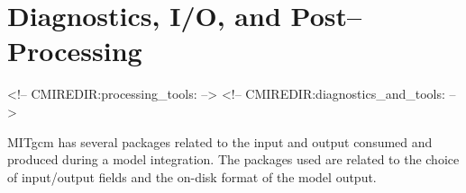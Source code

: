
\chapter{Diagnostics, I/O, and Post--Processing}
\begin{rawhtml}
<!-- CMIREDIR:processing_tools: -->
<!-- CMIREDIR:diagnostics_and_tools: -->
\end{rawhtml}


MITgcm has several packages related to the input and output consumed
and produced during a model integration. The packages used are related
to the choice of input/output fields and the on-disk format of the model
output.

\newpage


\newpage


\newpage


\newpage


\newpage


